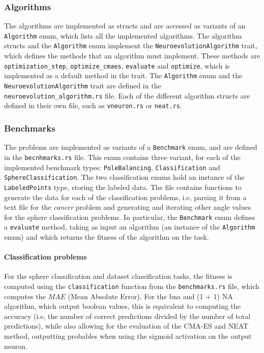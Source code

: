 \subsubsection{Algorithms}

The algorithms are implemented as structs and are accessed as variants of an \texttt{Algorithm} enum, which lists all the implemented algorithms.
The algorithm structs and the \texttt{Algorithm} enum implement the \texttt{NeuroevolutionAlgorithm} trait, which defines the methods that an algorithm must implement.
These methods are \texttt{optimization\_step}, \texttt{optimize\_cmaes}, \texttt{evaluate} and \texttt{optimize}, which is implemented as a default method in the trait.
The \texttt{Algorithm} enum and the \texttt{NeuroevolutionAlgorithm} trait are defined in the \texttt{neuroevolution\_algorithm.rs} file.
Each of the different algorithm structs are defined in their own file, such as \texttt{vneuron.rs} or \texttt{neat.rs}.

\subsubsection{Benchmarks}

The problems are implemented as variants of a \texttt{Benchmark} enum, and are defined in the \texttt{becnhmarks.rs} file.
This enum contains three variant, for each of the implemented benchmark types: \texttt{PoleBalancing}, \texttt{Classification} and \texttt{SphereClassification}.
The two classification enums hold an instance of the \texttt{LabeledPoints} type, storing the labeled data. The file contains functions to generate the
data for each of the classification problems, i.e, parsing it from a text file for the \textit{cancer} problem and generating and iterating other
angle values for the sphere classification problems. In particular, the \texttt{Benchmark} enum defines a \texttt{evaluate} method, taking as input an
algorithm (an instance of the \texttt{Algorithm} enum) and which returns the fitness of the algorithm on the task.

\paragraph{Classification problems} For the sphere classification and dataset classification tasks, the fitness is computed using the \texttt{classification}
function from the \texttt{benchmarks.rs} file, which computes the $MAE$ (Mean Absolute Error). For the bna and (1 + 1) NA algorithm, which output boolean
values, this is equivalent to computing the accuracy (i.e, the number of correct predictions divided by the number of total predictions), while also
allowing for the evaluation of the CMA-ES and NEAT method, outputting probables when using the sigmoid activation on the output neuron.

